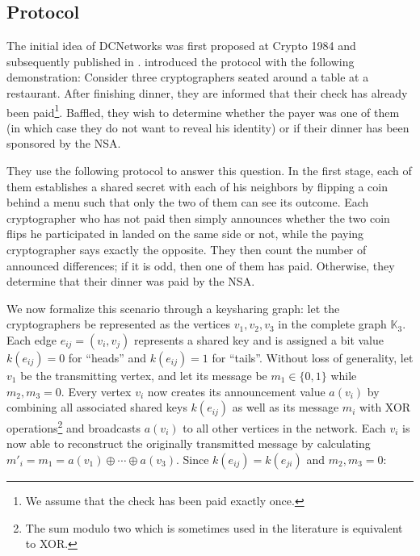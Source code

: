 
\subsection{Protocol}

The initial idea of \acp{DCNetwork} was first proposed
at Crypto 1984 and subsequently published in \citeyear{journals/joc/Chaum88} \cite{journals/joc/Chaum88}.
\citeauthor{journals/joc/Chaum88} introduced the protocol with the following demonstration:
Consider three cryptographers seated around a table at a restaurant.
After finishing dinner, they are informed that their check has already been paid\footnote{
We assume that the check has been paid exactly once.}.
Baffled, they wish to determine whether the payer was one of them (in which case
they do not want to reveal his identity) or if their dinner has been sponsored by the NSA.

They use the following protocol to answer this question.
In the first stage, each of them establishes a shared secret with each of his neighbors by flipping
a coin behind a menu such that only the two of them can see its outcome. 
Each cryptographer
who has not paid then simply announces whether the two coin flips he participated
in landed on the same side or not, while the paying cryptographer says exactly the opposite.
They then count the number of announced differences; if it is odd, then one of them has paid.
Otherwise, they determine that their dinner was paid by the NSA.

We now formalize this scenario through a keysharing graph: let the cryptographers be represented as the vertices 
$v_1, v_2, v_3$ in the complete graph $\mathbb{K}_3$. Each edge $e_{ij} = (v_i, v_j)$ represents a shared
key and is assigned a bit value $k(e_{ij}) = 0$ for ``heads'' and $k(e_{ij}) = 1$ for ``tails''. Without loss of generality,
let $v_1$ be the transmitting vertex, and let its message be $m_1 \in \{0, 1\}$ while $m_2, m_3 = 0$.
Every vertex $v_i$ now creates its announcement value $a(v_i)$ by combining all associated shared keys $k(e_{ij})$
as well as its message $m_i$ with XOR operations\footnote{
The sum modulo two which is sometimes used in the literature is equivalent to XOR.}
and broadcasts $a(v_i)$ to all other vertices in the network. Each $v_i$ is now able to
reconstruct the originally transmitted message by calculating
$m'_i = m_1 = a(v_1) \oplus \cdots \oplus a(v_3)$. Since $k(e_{ij}) = k(e_{ji})$ and $m_2, m_3 = 0$:

